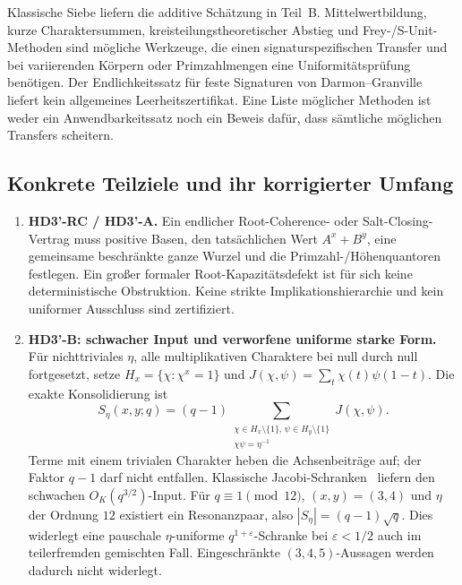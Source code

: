 \documentclass[11pt,a4paper]{article}
\begin{document}
Klassische Siebe liefern die additive Schätzung in Teil~B.
Mittelwertbildung, kurze Charaktersummen, kreisteilungstheoretischer
Abstieg und Frey-/S-Unit-Methoden sind mögliche Werkzeuge, die einen
signaturspezifischen Transfer und bei variierenden Körpern oder
Primzahlmengen eine Uniformitätsprüfung benötigen.
Der Endlichkeitssatz für feste Signaturen von Darmon--Granville~\cite{DarmonGranville1995}
liefert kein allgemeines Leerheitszertifikat.
Eine Liste möglicher Methoden ist weder ein Anwendbarkeitssatz noch
ein Beweis dafür, dass sämtliche möglichen Transfers scheitern.

\subsection*{Konkrete Teilziele und ihr korrigierter Umfang}
\begin{enumerate}[leftmargin=*]
\item \textbf{HD3'-RC / HD3'-A.} Ein endlicher Root-Coherence- oder
Salt-Closing-Vertrag muss positive Basen, den tatsächlichen Wert
$A^x+B^y$, eine gemeinsame beschränkte ganze Wurzel und die
Primzahl-/Höhenquantoren festlegen. Ein großer formaler
Root-Kapazitätsdefekt ist für sich keine deterministische Obstruktion.
Keine strikte Implikationshierarchie und kein uniformer Ausschluss sind zertifiziert.
\item \textbf{HD3'-B: schwacher Input und verworfene uniforme starke Form.}
Für nichttriviales $\eta$, alle multiplikativen Charaktere bei null
durch null fortgesetzt, setze $H_x=\{\chi:\chi^x=1\}$ und
$J(\chi,\psi)=\sum_t\chi(t)\psi(1-t)$. Die exakte Konsolidierung ist
\[
 S_\eta(x,y;q)=(q-1)
 \sum_{\substack{\chi\in H_x\setminus\{1\},\,\psi\in H_y\setminus\{1\}\\
                 \chi\psi=\eta^{-1}}}J(\chi,\psi).
\]
Terme mit einem trivialen Charakter heben die Achsenbeiträge auf;
der Faktor $q-1$ darf nicht entfallen. Klassische Jacobi-Schranken~\cite[Kap.~8]{IrelandRosen}
liefern den schwachen $O_K(q^{3/2})$-Input.
Für $q\equiv1\pmod{12}$, $(x,y)=(3,4)$ und $\eta$ der Ordnung $12$
existiert ein Resonanzpaar, also $|S_\eta|=(q-1)\sqrt q$.
Dies widerlegt eine pauschale $\eta$-uniforme $q^{1+\varepsilon}$-Schranke
bei $\varepsilon<1/2$ auch im teilerfremden gemischten Fall.
Eingeschränkte $(3,4,5)$-Aussagen werden dadurch nicht widerlegt.


\end{enumerate}
\end{document}
